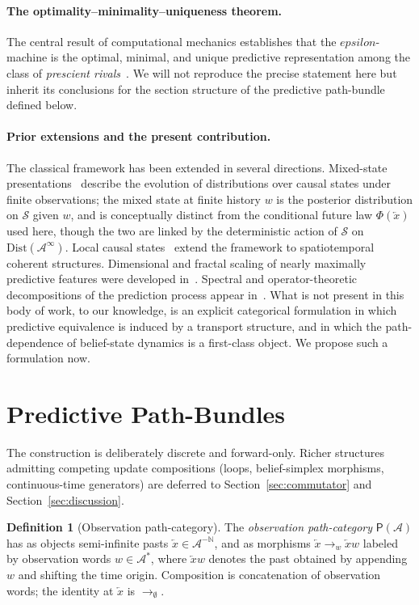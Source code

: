 \documentclass[11pt,a4paper]{article}
\def\varepsilon{epsilon}%
\theoremstyle{plain}
\theoremstyle{definition}
\newtheorem{definition}[theorem]{Definition}
\theoremstyle{remark}
\newcommand{\Dist}{\mathrm{Dist}}
\newcommand{\PathCat}{\mathsf{P}}
\newcommand{\Alphabet}{\mathcal{A}}
\newcommand{\States}{\mathcal{S}}
\newcommand{\Past}{\overleftarrow{x}}
\newcommand{\Pasts}{\Alphabet^{-\mathbb{N}}}
\begin{document}
\paragraph{The optimality--minimality--uniqueness theorem.}
The central result of computational mechanics establishes that the $\varepsilon$-machine is the optimal, minimal, and unique predictive representation among the class of \emph{prescient rivals}~\cite{shalizi2001}. We will not reproduce the precise statement here but inherit its conclusions for the section structure of the predictive path-bundle defined below.

\paragraph{Prior extensions and the present contribution.}
The classical framework has been extended in several directions. Mixed-state presentations~\cite{james2011anatomy} describe the evolution of distributions over causal states under finite observations; the mixed state at finite history $w$ is the posterior distribution on $\States$ given $w$, and is conceptually distinct from the conditional future law $\Phi(\Past)$ used here, though the two are linked by the deterministic action of $\States$ on $\Dist(\Alphabet^\infty)$. Local causal states~\cite{rupe2018} extend the framework to spatiotemporal coherent structures. Dimensional and fractal scaling of nearly maximally predictive features were developed in~\cite{marzen2017}. Spectral and operator-theoretic decompositions of the prediction process appear in~\cite{riechers2018a,riechers2018b}. What is not present in this body of work, to our knowledge, is an explicit categorical formulation in which predictive equivalence is induced by a transport structure, and in which the path-dependence of belief-state dynamics is a first-class object. We propose such a formulation now.

\section{Predictive Path-Bundles}
\label{sec:bundles}

The construction is deliberately discrete and forward-only. Richer structures admitting competing update compositions (loops, belief-simplex morphisms, continuous-time generators) are deferred to Section~\ref{sec:commutator} and Section~\ref{sec:discussion}.

\begin{definition}[Observation path-category]
\label{def:pathcat}
The \emph{observation path-category} $\PathCat(\Alphabet)$ has as objects semi-infinite pasts $\Past \in \Pasts$, and as morphisms $\Past \to_w \Past w$ labeled by observation words $w \in \Alphabet^*$, where $\Past w$ denotes the past obtained by appending $w$ and shifting the time origin. Composition is concatenation of observation words; the identity at $\Past$ is $\to_\emptyset$.
\end{definition}
\end{document}
